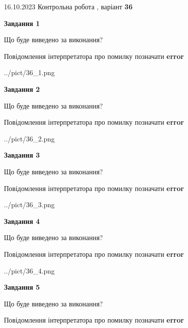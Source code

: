\documentclass[12pt, ukrainian]{article}
\begin{document}
{\Large{16.10.2023 Контрольна робота , варіант  \No \textbf { 36 }\par}}
{
\begin {large}
{\begin {center}\textbf{Завдання 1}\end {center}}\par
Що буде виведено за виконання? \par
Повідомлення інтерпретатора про помилку позначати \textbf{error}

\begin{center}
	{../pict/36_1.png}
\end{center}
\newpage

{\begin {center}\textbf{Завдання 2}\end {center}}\par
Що буде виведено за виконання? \par
Повідомлення інтерпретатора про помилку позначати \textbf{error}

\begin{center}
	{../pict/36_2.png}
\end{center}
\newpage

{\begin {center}\textbf{Завдання 3}\end {center}}\par
Що буде виведено за виконання? \par
Повідомлення інтерпретатора про помилку позначати \textbf{error}

\begin{center}
	{../pict/36_3.png}
\end{center}
\newpage

{\begin {center}\textbf{Завдання 4}\end {center}}\par
Що буде виведено за виконання? \par
Повідомлення інтерпретатора про помилку позначати \textbf{error}

\begin{center}
	{../pict/36_4.png}
\end{center}
\newpage

{\begin {center}\textbf{Завдання 5}\end {center}}\par
Що буде виведено за виконання? \par
Повідомлення інтерпретатора про помилку позначати \textbf{error}


\end{large}}
\end{document}
